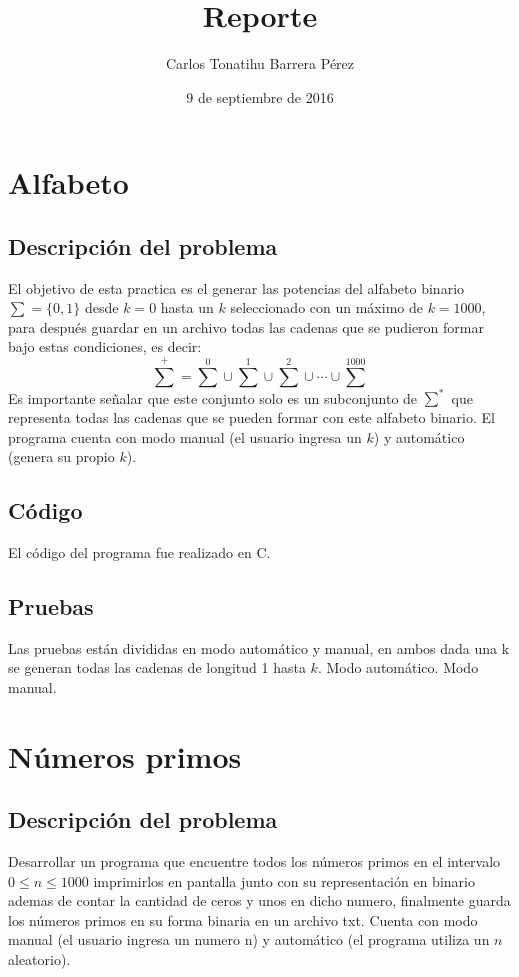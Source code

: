 \documentclass[12pt, titlepage]{article}
\title{Reporte}
\author{Carlos Tonatihu Barrera Pérez}
\date{9 de septiembre de 2016}
\begin{document}
	\maketitle
	\tableofcontents
	\newpage
	
	\section{Alfabeto}
	\subsection{Descripción del problema}
	El objetivo de esta practica es el generar las potencias del alfabeto binario $ \sum = \lbrace 0, 1 \rbrace $ desde $k=0$ hasta un $k$ seleccionado con un máximo de $k=1000$, para después guardar en un archivo todas las cadenas que se pudieron formar bajo estas condiciones, es decir: 
	\[{\sum}^{+} = {\sum}^{0}\cup{\sum}^{1}\cup{\sum}^{2}\cup\cdots\cup{\sum}^{1000}\]
	Es importante señalar que este conjunto solo es un subconjunto de $ {\sum}^{*} $ que representa todas las cadenas que se pueden formar con este alfabeto binario.
	El programa cuenta con modo manual (el usuario ingresa un $k$) y automático (genera su propio $k$).
	\subsection{Código}
	El código del programa fue realizado en C.
	\subsection{Pruebas}
	Las pruebas están divididas en modo automático y manual, en ambos dada una k se generan todas las cadenas de longitud 1 hasta $k$.
	{\large Modo automático.}
	{\large Modo manual.}
	
	\section{Números primos}
	\subsection{Descripción del problema}
	Desarrollar un programa que encuentre todos los números primos en el intervalo $0 \leq n \leq 1000$ imprimirlos en pantalla junto con su representación en binario ademas de contar la cantidad de ceros y unos en dicho numero, finalmente guarda los números primos en su forma binaria en un archivo txt.
	Cuenta con modo manual (el usuario ingresa un numero n) y automático (el programa utiliza un $n$ aleatorio).
\end{document}
